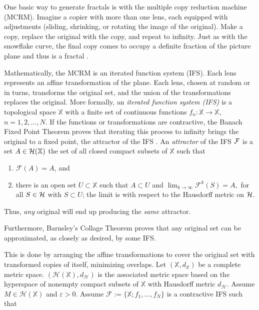 \documentclass[english,11pt,letterpaper,onecolumn]{scrartcl}
\numberwithin{equation}{section}
\newcommand{\X}{\mathbb{X}}
\newcommand{\cF}{\mathcal{F}}
\newcommand{\calH}{\mathcal{H}}
\begin{document}

One basic way to generate fractals is with the multiple copy reduction
machine (MCRM). Imagine a copier with more than one lens, each equipped with
adjustments (sliding, shrinking, or rotating the image of the original). Make
a copy, replace the original with the copy, and repeat to infinity. Just as
with the snowflake curve, the final copy comes to occupy a definite fraction
of the picture plane and thus is a fractal \cite{chaosandfractals}.

Mathematically, the MCRM is an iterated function system (IFS). Each lens
represents an affine transformation of the plane. Each lens, chosen at random
or in turns, transforms the original set, and the union of the transformations
replaces the original. More formally, an \emph{iterated function system (IFS)}
is a topological space $\mathbb{X}$ with a finite set of continuous functions
$f_{n}:\X\rightarrow \X$,
$n=1,2,\dots,N$. If the functions or transformations are contractive, the
Banach Fixed Point Theorem proves that iterating this process to infinity
brings the original to a fixed point, the attractor of the IFS
\cite{chaosandfractals, barnsley1985iterated, 10.2307/24893080,
fractalseverywhere}. An \emph{attractor} of the IFS $\cal{F}$ is a set
$A\in \cal{H}(\X)$ the set of all closed compact subsets of $\X$ such that

\begin{enumerate}
\item $\cF(A)=A$, and
\item there is an open set $U\subset \X$ such that $A\subset U$ and
$\lim_{k\rightarrow\infty}\mathcal{F}^{k}(S)=A,$ for all $S\in \cal{H}$ with
$S\subset U$; the limit is with respect to the Hausdorff metric on $\cal{H}$.
\end{enumerate}

\noindent Thus, \textit{any} original will end up producing the
\textit{same} attractor.

Furthermore, Barnsley's Collage Theorem \cite{barnsley:1986:solution} proves
that any original set can be approximated, as closely as desired, by some IFS.

This is done by arranging the affine transformations to cover the original set
with transformed copies of itself, minimizing overlaps. Let
$(\mathbb{X},d_\mathbb{X})$ be a complete metric space. $(\calH (\X),
d_\calH)$
is the associated metric space based on the hyperspace of nonempty compact
subsets of $\X$ with Hausdorff metric $d_\calH$. Assume $M\in\calH(\X)$ and
$\varepsilon > 0$. Assume $\cF := \{\X; f_1, \ldots, f_N\}$ is a contractive
IFS such that
\end{document}
